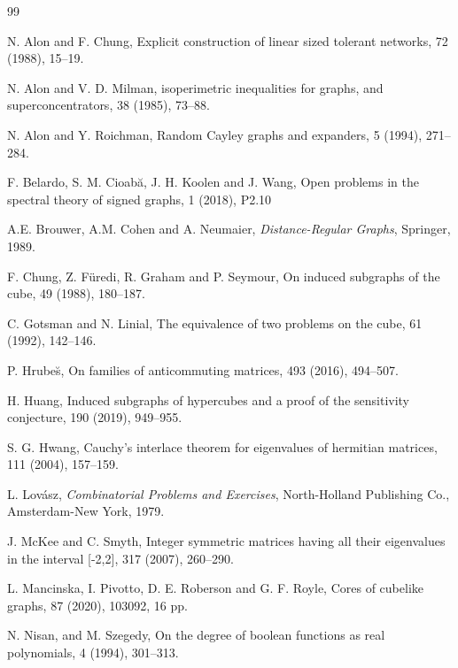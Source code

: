 \begin{thebibliography}{99}

N. Alon and F. Chung,
\newblock Explicit construction of linear sized tolerant networks,
 72 (1988), 15--19.

N. Alon and V. D. Milman, 
 isoperimetric inequalities for graphs, and
superconcentrators,
 38 (1985), 73--88.

N. Alon and Y. Roichman, 
\newblock Random Cayley graphs and expanders,
 5 (1994), 271--284.

F. Belardo, S. M.  Cioab\u{a}, J. H. Koolen and J. Wang, 
\newblock Open problems in the spectral theory of signed graphs,
 1 (2018), P2.10

\newblock A.E. Brouwer, A.M. Cohen and A. Neumaier, 
{\em Distance-Regular Graphs}, Springer, 1989.

F. Chung, Z. F{\"u}redi, R. Graham and P. Seymour, 
\newblock On induced subgraphs of the cube,
 49 (1988), 180--187.

C. Gotsman and N. Linial, 
\newblock The equivalence of two problems on the cube,
 61 (1992), 142--146.

P. Hrube\u{s}, 
\newblock On families of anticommuting matrices,
 493 (2016), 494--507.

H. Huang, 
\newblock Induced subgraphs of hypercubes and a proof of the sensitivity conjecture,
 190 (2019), 949--955.

S. G. Hwang, 
\newblock Cauchy's interlace theorem for eigenvalues of hermitian matrices,
 111 (2004), 157--159.

L. Lov\'{a}sz, 
{\em Combinatorial Problems and Exercises},
North-Holland Publishing Co., Amsterdam-New York, 1979.

J. McKee and C. Smyth, 
\newblock Integer symmetric matrices having all their eigenvalues in the
interval [-2,2],
 317 (2007), 260--290.

L. Mancinska, I. Pivotto, D. E. Roberson and G. F. Royle, 
\newblock Cores of cubelike graphs, 
 87 (2020), 103092, 16 pp.

N. Nisan, and M. Szegedy, 
\newblock On the degree of boolean functions as real polynomials,
 4 (1994), 301--313.



\end{thebibliography}